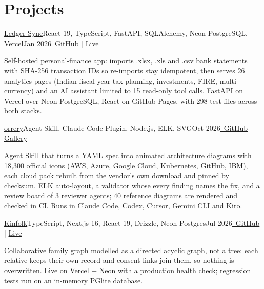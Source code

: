 \section{\textbf{Projects}}
\vspace{-2pt}
\resumeSubHeadingListStart

\resumeExp
{\href{https://sagargupta.online/ledger-sync/}{Ledger Sync}}{React 19, TypeScript, FastAPI, SQLAlchemy, Neon PostgreSQL, Vercel}{Jan 2026}{\href{https://github.com/Sagargupta16/ledger-sync}{\faGithub\ GitHub} | \href{https://sagargupta.online/ledger-sync/}{Live}}
\resumeItemListStart
    \item[$\diamond$] Self-hosted personal-finance app: imports .xlsx, .xls and .csv bank statements with SHA-256 transaction IDs so re-imports stay idempotent, then serves 26 analytics pages (Indian fiscal-year tax planning, investments, FIRE, multi-currency) and an AI assistant limited to 15 read-only tool calls. FastAPI on Vercel over Neon PostgreSQL, React on GitHub Pages, with 298 test files across both stacks.
\resumeItemListEnd

\resumeExp
{\href{https://sagargupta.online/orrery/}{orrery}}{Agent Skill, Claude Code Plugin, Node.js, ELK, SVG}{Oct 2026}{\href{https://github.com/Sagargupta16/orrery}{\faGithub\ GitHub} | \href{https://sagargupta.online/orrery/gallery/}{Gallery}}
\resumeItemListStart
    \item[$\diamond$] Agent Skill that turns a YAML spec into animated architecture diagrams with 18,300 official icons (AWS, Azure, Google Cloud, Kubernetes, GitHub, IBM), each cloud pack rebuilt from the vendor's own download and pinned by checksum. ELK auto-layout, a validator whose every finding names the fix, and a review board of 3 reviewer agents; 40 reference diagrams are rendered and checked in CI. Runs in Claude Code, Codex, Cursor, Gemini CLI and Kiro.
\resumeItemListEnd

\resumeExp
{\href{https://kinfolk-neon.vercel.app/}{Kinfolk}}{TypeScript, Next.js 16, React 19, Drizzle, Neon Postgres}{Jul 2026}{\href{https://github.com/Sagargupta16/kinfolk}{\faGithub\ GitHub} | \href{https://kinfolk-neon.vercel.app/}{Live}}
\resumeItemListStart
    \item[$\diamond$] Collaborative family graph modelled as a directed acyclic graph, not a tree: each relative keeps their own record and consent links join them, so nothing is overwritten. Live on Vercel + Neon with a production health check; regression tests run on an in-memory PGlite database.
\resumeItemListEnd

